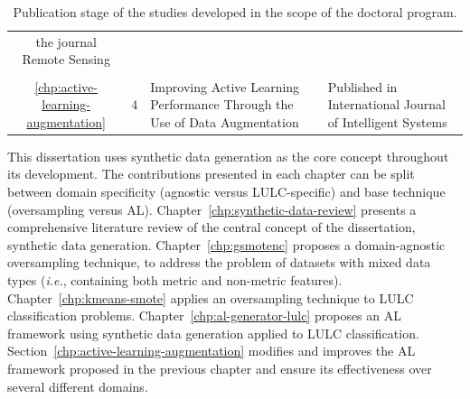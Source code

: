 \begin{table}
\begin{tabular}{ccm{}m{}}
                                                                                         the journal 
                                                                                         Remote Sensing   \\
        \vspace{-.2cm}\\
        \ref{chp:active-learning-augmentation} & 4 & Improving Active Learning 
                                                   Performance Through the Use of
                                                   Data Augmentation
                                               & Published in International
                                               Journal of Intelligent Systems   \\
        \bottomrule
    \end{tabular}
    \caption{\label{tab:studies}
        Publication stage of the studies developed in the scope of the doctoral
        program.
    }
\end{table}

This dissertation uses synthetic data generation as the core concept
throughout its development. The contributions presented in each chapter
can be split between domain specificity (agnostic versus LULC-specific) and
base technique (oversampling versus AL).
Chapter~\ref{chp:synthetic-data-review} presents a comprehensive literature
review of the central concept of the dissertation, synthetic data generation.
Chapter~\ref{chp:gsmotenc} proposes a domain-agnostic oversampling technique,
to address the problem of datasets with mixed data types (\textit{i.e.},
containing both metric and non-metric features).
Chapter~\ref{chp:kmeans-smote} applies an oversampling technique to LULC
classification problems. Chapter~\ref{chp:al-generator-lulc} proposes an AL
framework using synthetic data generation applied to LULC classification.
Section~\ref{chp:active-learning-augmentation} modifies and improves the
AL framework proposed in the previous chapter and ensure its effectiveness
over several different domains. 
